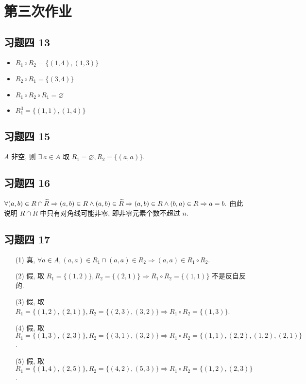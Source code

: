 \chapter{第三次作业}

\section{习题四 13}

\begin{solution}
	\begin{itemize}
		\item $R_1 \circ R_2=\{(1,4),(1,3)\}$
		\item $R_2 \circ R_1=\{(3,4)\}$
		\item $R_1\circ R_2\circ R_1=\varnothing$
		\item $R_1^3=\{(1,1),(1,4)\}$
	\end{itemize}
\end{solution}

\section{习题四 15}

\begin{solution}
	$A$ 非空, 则 $\exists\  a \in A$ 取 $R_1=\varnothing,R_2=\{(a,a)\}$. 
\end{solution}

\section{习题四 16}

\begin{solution}
	$
	\forall (a,b) \in R\cap \widetilde{R} \Rightarrow (a,b) \in R \wedge (a,b) \in \widetilde{R} \\
	\Rightarrow (a,b) \in R \wedge (b,a) \in R \Rightarrow a=b.
	$
	由此说明 $R \cap \widetilde{R}$ 中只有对角线可能非零, 即非零元素个数不超过 $n$.
\end{solution}

\section{习题四 17}

\begin{solution}
	\begin{itemize}
		\item[(1)] 真, $\forall a \in A, (a,a) \in R_1 \cap (a,a) \in R_2 \Rightarrow (a,a) \in R_1 \circ R_2$.
		\item[(2)] 假, 取 $R_1=\{(1,2)\},R_2=\{(2,1)\}\Rightarrow R_1 \circ R_2=\{(1,1)\}$ 不是反自反的.
		\item[(3)] 假, 取 $R_1=\{(1,2),(2,1)\},R_2=\{(2,3),(3,2)\}\Rightarrow R_1\circ R_2=\{(1,3)\}$.
		\item[(4)] 假, 取 $R_1=\{(1,3),(2,3)\},R_2=\{(3,1),(3,2)\}\Rightarrow R_1\circ R_2=\{(1,1),(2,2),(1,2),(2,1)\}$.
		\item[(5)] 假, 取 $R_1=\{(1,4),(2,5)\},R_2=\{(4,2),(5,3)\}\Rightarrow R_1\circ R_2=\{(1,2),(2,3)\}$.
	\end{itemize}
\end{solution}


